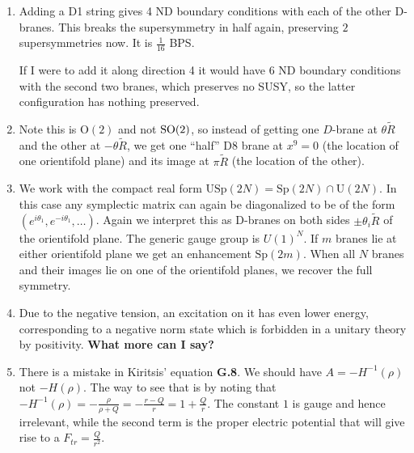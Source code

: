 \documentclass[11pt, class=article, crop=false]{standalone}
\begin{document}
\begin{enumerate}
	\item Adding a D1 string gives 4 ND boundary conditions with each of the other D-branes. This breaks the supersymmetry in half again, preserving $2$ supersymmetries now. It is $\frac{1}{16}$ BPS. 
	
	If I were to add it along direction 4 it would have 6 ND boundary conditions with the second two branes, which preserves no SUSY, so the latter configuration has nothing preserved. 
	
	\item Note this is $\mathrm O(2)$ and not $\mathrm{SO}(2)$, so instead of getting one $D$-brane at $\theta \tilde R$ and the other at $-\theta \tilde R$, we get one ``half'' D8 brane at $x^9 = 0$ (the location of one orientifold plane) and its image at $\pi \tilde R$ (the location of the other).
	
	
	\item %
	We work with the compact real form $\mathrm{USp}(2N) = \mathrm{Sp}(2N) \cap \mathrm U(2N)$. In this case any symplectic matrix can again be diagonalized to be of the form $(e^{i \theta_1}, e^{-i\theta_1}, \dots )$. Again we interpret this as D-branes on both sides $\pm \theta_i \tilde R$ of the orientifold plane. The generic gauge group is $U(1)^{N}$. If $m$ branes lie at either orientifold plane we get an enhancement $\mathrm{Sp}(2m)$. When all $N$ branes and their images lie on one of the orientifold planes, we recover the full symmetry. 
	
	\item Due to the negative tension, an excitation on it has even lower energy, corresponding to a negative norm state which is forbidden in a unitary theory by positivity. \textbf{What more can I say? }
	
	\item There is a mistake in Kiritsis' equation \textbf{G.8}. We should have $A = -H^{-1}(\rho)$ not $-H(\rho)$. The way to see that is by noting that $-H^{-1}(\rho) = -\frac{\rho}{\rho+Q} = -\frac{r-Q}{r} = 1 + \frac{Q}{r}$. The constant $1$ is gauge and hence irrelevant, while the second term is the proper electric potential that will give rise to a $F_{tr} = \frac{Q}{r^2}$.
	

\end{enumerate}
\end{document}
